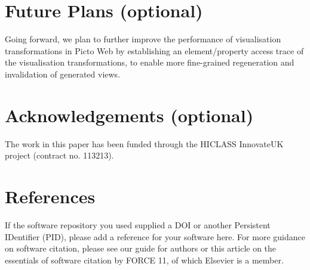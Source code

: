 \documentclass[preprint,12pt, a4paper]{elsarticle}
\begin{document}
\section{Future Plans (optional)}
Going forward, we plan to further improve the performance of visualisation transformations in Picto Web by establishing an element/property access trace of the visualisation transformations, to enable more fine-grained regeneration and invalidation of generated views.

\section*{Acknowledgements (optional)}
\label{}
The work in this paper has been funded through the HICLASS InnovateUK project (contract no. 113213).

\section*{References}

If the software repository you used supplied a DOI or another Persistent
IDentifier (PID), please add a reference for your software here. For more
guidance on software citation, please see our guide for authors or this
article on the essentials of software citation by FORCE 11, of which Elsevier
is a member.

  
  


%
%
%
\end{document}
